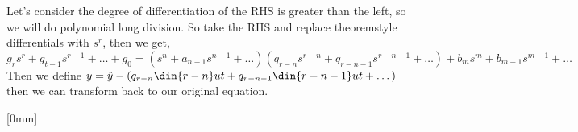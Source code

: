 Let's consider the degree of differentiation of the RHS is greater than the left, so we will do polynomial long division. So take the RHS and replace theoremstyle differentials with $s^r$, then we get,
$$ g_rs^r + g_{t-1}s^{r-1} + \dots + g_0 = (s^n + a_{n-1}s^{n-1} + \dots) (q_{r-n}s^{r-n} + q_{r-n-1}s^{r-n-1} + \dots) + b_ms^m + b_{m-1}s^{m-1} + \dots $$
Then we define $y = \hat y - (q_{r-n}\din {r-n} u t + q_{r-n-1}\din {r-n-1} u t + \dots)$ then we can transform back to our original equation.

[0mm]
